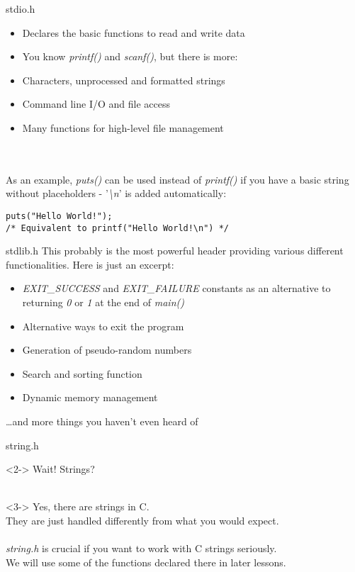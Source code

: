 \begin{frame}[fragile]{stdio.h}
	\begin{itemize}
		\item Declares the basic functions to read and write data
		\item You know \textit{printf()} and \textit{scanf()}, but there is more:
		\item Characters, unprocessed and formatted strings
		\item Command line I/O and file access
		\item Many functions for high-level file management
	\end{itemize} \ \\ \ \\
	As an example, \textit{puts()} can be used instead of \textit{printf()} if you have a basic string without placeholders - '\textit{\textbackslash n}' is added automatically:
	\begin{lstlisting}[numbers=none]
puts("Hello World!");
/* Equivalent to printf("Hello World!\n") */
\end{lstlisting}
\end{frame}
\begin{frame}{stdlib.h}
	This probably is the most powerful header providing various different functionalities. Here is just an excerpt:
	\begin{itemize}
		\item \textit{EXIT\_SUCCESS} and \textit{EXIT\_FAILURE} constants as an alternative to returning \textit{0} or \textit{1} at the end of \textit{main()}
		\item Alternative ways to exit the program
		\item Generation of pseudo-random numbers
		\item Search and sorting function
		\item Dynamic memory management
	\end{itemize}
		\dots and more things you haven't even heard of
\end{frame}
\begin{frame}{string.h}
	\begin{uncoverenv}<2->
		Wait! Strings? \\ \ \\
	\end{uncoverenv}
	\begin{uncoverenv}<3->
		Yes, there are strings in C. \\
		They are just handled differently from what you would expect. \\ \ \\
		\textit{string.h} is crucial if you want to work with C strings seriously. \\
		We will use some of the functions declared there in later lessons.
	\end{uncoverenv}
\end{frame}
